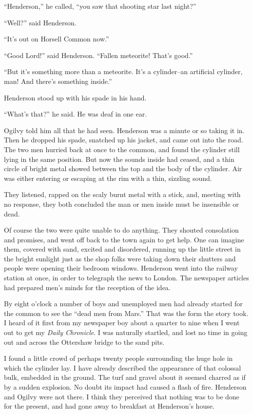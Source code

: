 ``Henderson,'' he called, ``you saw that shooting star last night?''

``Well?'' said Henderson.

``It's out on Horsell Common now.''

``Good Lord!'' said Henderson. ``Fallen meteorite! That's good.''

``But it's something more than a meteorite. It's a cylinder--an
artificial cylinder, man! And there's something inside.''

Henderson stood up with his spade in his hand.

``What's that?'' he said. He was deaf in one ear.

Ogilvy told him all that he had seen. Henderson was a minute or so
taking it in. Then he dropped his spade, snatched up his jacket,
and came out into the road. The two men hurried back at once to the
common, and found the cylinder still lying in the same position.
But now the sounds inside had ceased, and a thin circle of bright
metal showed between the top and the body of the cylinder. Air was
either entering or escaping at the rim with a thin, sizzling
sound.

They listened, rapped on the scaly burnt metal with a stick, and,
meeting with no response, they both concluded the man or men inside
must be insensible or dead.

Of course the two were quite unable to do anything. They shouted
consolation and promises, and went off back to the town again to
get help. One can imagine them, covered with sand, excited and
disordered, running up the little street in the bright sunlight
just as the shop folks were taking down their shutters and people
were opening their bedroom windows. Henderson went into the railway
station at once, in order to telegraph the news to London. The
newspaper articles had prepared men's minds for the reception of
the idea.

By eight o'clock a number of boys and unemployed men had already
started for the common to see the ``dead men from Mars.'' That was
the form the story took. I heard of it first from my newspaper boy
about a quarter to nine when I went out to get my
\emph{Daily Chronicle}. I was naturally startled, and lost no time
in going out and across the Ottershaw bridge to the sand pits.

I found a little crowd of perhaps twenty people surrounding the
huge hole in which the cylinder lay. I have already described the
appearance of that colossal bulk, embedded in the ground. The turf
and gravel about it seemed charred as if by a sudden explosion. No
doubt its impact had caused a flash of fire. Henderson and Ogilvy
were not there. I think they perceived that nothing was to be done
for the present, and had gone away to breakfast at Henderson's
house.

